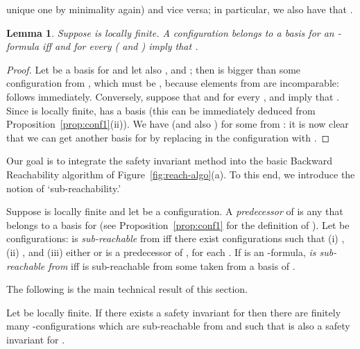 \documentclass{LMCS}
\theoremstyle{plain}\newtheorem{assumption}[thm]{Assumption}
\theoremstyle{plain}\newtheorem{proposition}[thm]{Proposition}
\theoremstyle{plain}\newtheorem{property}[thm]{Property}
\theoremstyle{plain}\newtheorem{example}[thm]{Example}
\theoremstyle{plain}\newtheorem{claim}[thm]{Claim}
\theoremstyle{plain}\newtheorem{lemma}[thm]{Lemma}
\begin{document}
unique one by minimality again) and vice versa; in particular, we also
have that .
\begin{lemma}\label{lem:basis}
Suppose  is locally finite.
  A configuration  belongs to a basis for an -formula
   iff  and for every  ( and
  ) imply that .
\end{lemma}
\begin{proof}
  Let  be a basis for  and let also ,  and
  ; then  is bigger than some configuration
  from , which must be , because elements from  are
  incomparable:  follows immediately. Conversely, suppose
  that  and for every ,  and  imply that .  Since  is locally
  finite,  has a basis  (this can be immediately deduced from
  Proposition~\ref{prop:conf1}(ii)). We have  (and also
  ) for some  from : it is now clear that we can get
  another basis for  by replacing in  the configuration  with
  .
\end{proof}
Our goal is to integrate the safety invariant method into the basic
Backward Reachability algorithm of Figure~\ref{fig:reach-algo}(a).  To
this end, we introduce the
notion of `sub-reachability.'
\begin{defi}
  \label{def:subreach-configs}
  Suppose  is locally finite and let  be a configuration.  A
  \emph{predecessor} of  is any  that belongs to a basis for
   (see Proposition~\ref{prop:conf1} for the
  definition of ).  Let  be configurations:  is
  \emph{sub-reachable} from  iff there exist configurations  such that (i) , (ii) , and (iii) either
   or  is a predecessor of , for each
  .  If  is an -formula, \emph{ is
    sub-reachable from } iff  is sub-reachable from some 
  taken from a basis of .
\end{defi}
The following is the main technical result of this section.
\begin{thm}
  \label{th:inv}
  Let  be locally finite.  If there exists a safety invariant for
   then there are finitely many -configurations  which are sub-reachable from  and such that  is also a safety invariant for .
\end{thm}
\end{document}
